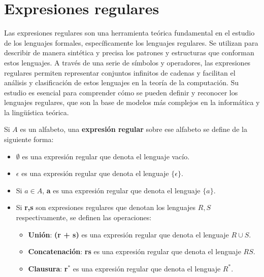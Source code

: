 \section{Expresiones regulares}\label{section:expr}
Las expresiones regulares son una herramienta teórica fundamental en el estudio de los lenguajes formales, específicamente los lenguajes regulares. Se utilizan para describir de manera sintética y precisa los patrones y estructuras que conforman estos lenguajes. A través de una serie de símbolos y operadores, las expresiones regulares permiten representar conjuntos infinitos de cadenas y facilitan el análisis y clasificación de estos lenguajes en la teoría de la computación. Su estudio es esencial para comprender cómo se pueden definir y reconocer los lenguajes regulares, que son la base de modelos más complejos en la informática y la lingüística teórica.

Si $A$ es un alfabeto, una \textbf{expresión regular} sobre ese alfabeto se define de la siguiente forma:

\begin{itemize}
    \item $\emptyset$ es una expresión regular que denota el lenguaje vacío.
    \item $\epsilon$ es una expresión regular que denota el lenguaje $\lbrace \epsilon \rbrace$.
    \item Si $a \in A$, \textbf{a} es una expresión regular que denota el lenguaje $\lbrace a \rbrace$.
    \item Si \textbf{r,s} son expresiones regulares que denotan los lenguajes $R,S$ respectivamente, se definen las operaciones:
    \begin{itemize}
        \item \textbf{Unión}: \textbf{(r + s)} es una expresión regular que denota el lenguaje $R \cup S$.
        \item \textbf{Concatenación}: \textbf{rs} es una expresión regular que denota el lenguaje $RS$.
        \item \textbf{Clausura}: \textbf{r$^*$} es una expresión regular que denota el lenguaje $R^*$.
    \end{itemize}
\end{itemize}

